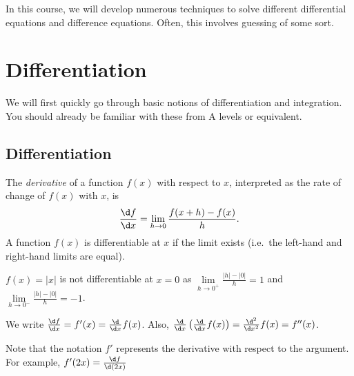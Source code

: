 \documentclass[a4paper]{article}
\begin{document}
In this course, we will develop numerous techniques to solve different differential equations and difference equations. Often, this involves guessing of some sort.

\section{Differentiation}
We will first quickly go through basic notions of differentiation and integration. You should already be familiar with these from A levels or equivalent.

\subsection{Differentiation}
\begin{defi}
  The \emph{derivative} of a function $f(x)$ with respect to $x$, interpreted as the rate of change of $f(x)$ with $x$, is
  \[
    \frac{\d f}{\d x} = \lim_{h\to 0} \frac{f(x + h) - f(x)}{h}.
  \]
  A function $f(x)$ is differentiable at $x$ if the limit exists (i.e.\ the left-hand and right-hand limits are equal).
\end{defi}

\begin{eg}
  $f(x)=|x|$ is not differentiable at $x = 0$ as $\lim\limits_{h\to 0^+} \frac{|h| - |0|}{h}= 1$ and $\lim\limits_{h\to 0^-} \frac{|h| - |0|}{h}= -1$.
\end{eg}

\begin{notation}
  We write $\frac{\d f}{\d x} = f'(x) = \frac{\d}{\d x} f(x)$. Also, $\frac{\d}{\d x}\left(\frac{\d}{\d x} f(x)\right) = \frac{\d^2}{\d x^2} f(x) = f''(x)$.

  Note that the notation $f'$ represents the derivative with respect to the argument. For example, $f'(2x) = \frac{\d f}{\d (2x)}$
\end{notation}
\end{document}
